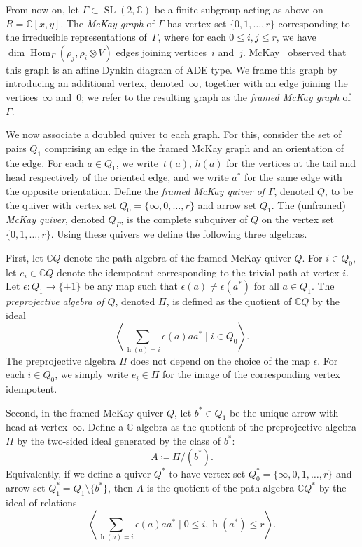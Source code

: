 \documentclass[pdftex]{sigma}%
\newcommand{\SC}{\mathbb{C}} %
\newcommand{\head}{\operatorname{h}}
\newcommand{\Hom}{\operatorname{Hom}}
\newcommand{\SL}{\operatorname{SL}}
\newcommand{\PiQ}{A}
\numberwithin{equation}{section}
\begin{document}
From now on, let $\Gamma \subset \SL(2,\SC)$ be a finite subgroup acting as above on $R=\SC[x,y]$. The \emph{McKay graph} of $\Gamma$
has vertex set $\{0,1, \dots, r\}$ corresponding to the irreducible representations of~$\Gamma$, where for each $0\leq i, j\leq r$, we have $\dim\Hom_{\Gamma}(\rho_j , \rho_i \otimes V )$ edges joining vertices~$i$ and~$j$. McKay~\cite{McKay80} observed that this graph is an affine Dynkin diagram of ADE type. We frame this graph by introducing an additional vertex, denoted~$\infty$, together with an edge joining the vertices~$\infty$ and~$0$; we refer to the resulting graph as the \emph{framed McKay graph} of~$\Gamma$.

We now associate a doubled quiver to each graph. For this, consider
the set of pairs $Q_1$ comprising an edge in the framed McKay graph
and an orientation of the edge. For each $a\in Q_1$, we write~$t(a)$,
$h(a)$ for the vertices at the tail and head respectively of
the oriented edge, and we write $a^{\ast}$ for the same edge with
the opposite orientation. Define the \emph{framed McKay quiver of $\Gamma$},
denoted $Q$, to be the quiver with vertex set $Q_0= \{\infty,0,\dots ,r\}$
and arrow set $Q_1$. The (unframed) \emph{McKay quiver},
denoted $Q_\Gamma$, is the complete subquiver of $Q$ on
the vertex set $\{0, 1,\dots, r\}$. Using these quivers
we define the following three algebras.

First, let $\SC Q$ denote the path algebra of the framed McKay quiver $Q$. For $i \in Q_0$, let $e_i \in \SC Q$ denote the idempotent corresponding to the trivial path at vertex $i$. Let $\epsilon\colon Q_1 \to \{\pm 1\}$ be any map such that $\epsilon(a) \neq \epsilon(a^{\ast})$ for all $a \in Q_1$. The \emph{preprojective algebra of $Q$}, denoted $\Pi$, is defined as the quotient of $\SC Q$ by the ideal
\begin{equation}
\label{eqn:preprojectiverelation}
\left\langle \sum_{\head(a)=i} \epsilon(a) aa^{\ast} \mid {i \in Q_0}
\right\rangle.
\end{equation}
 The preprojective algebra $\Pi$ does not depend on the choice of the map $\epsilon$. For each $i\in Q_0$, we simply write $e_i\in \Pi$ for the image of the corresponding vertex idempotent.

Second, in the framed McKay quiver $Q$, let $b^*\in Q_1$ be the unique arrow with head at vertex~$\infty$. Define a $\SC$-algebra as the quotient of the preprojective algebra $\Pi$ by the two-sided ideal generated by the class of $b^*$:
 \[
 \PiQ\coloneqq \Pi/(b^*).
 \]
 Equivalently, if we define a quiver $Q^*$ to have vertex set $Q^*_0=\{\infty,0,1,\dots,r\}$ and arrow set $Q_1^*=Q_1\setminus \{b^*\}$, then $\PiQ$ is the quotient of the path algebra $\SC Q^*$ by the ideal of relations
 \begin{equation*}%
 \left\langle \sum_{\head(a) = i} \epsilon(a) aa^* \mid 0\leq i,
 \head(a^*)\leq r \right\rangle.
 \end{equation*}
\end{document}
